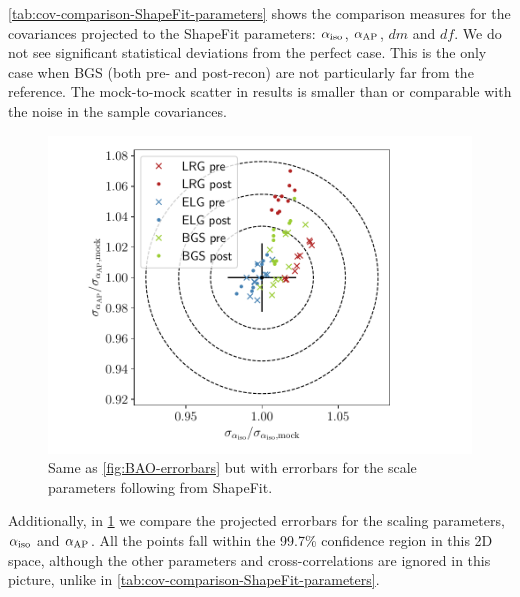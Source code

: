 \cref{tab:cov-comparison-ShapeFit-parameters} shows the comparison measures for the covariances projected to the ShapeFit parameters: ${\alpha_{\rm iso}}$, ${\alpha_{\rm AP}}$, $dm$ and $df$.
We do not see significant statistical deviations from the perfect case.
This is the only case when BGS (both pre- and post-recon) are not particularly far from the reference.
The mock-to-mock scatter in \rascalc{} results is smaller than or comparable with the noise in the sample covariances.

\begin{figure}[tb]
\centering
\includegraphics[width=\textwidth]{img/DESI-Y1/normalized_errorbars_shapefit.pdf}
\caption[Comparison of the projected errorbars for the BAO scale parameters for \desimock{} from ShapeFit]{Same as \cref{fig:BAO-errorbars} but with errorbars for the scale parameters following from ShapeFit.}
\label{fig:shapefit-scale-errorbars}
\end{figure}

Additionally, in \cref{fig:shapefit-scale-errorbars} we compare the projected errorbars for the scaling parameters, ${\alpha_{\rm iso}}$ and ${\alpha_{\rm AP}}$.
All the points fall within the 99.7\% confidence region in this 2D space, although the other parameters and cross-correlations are ignored in this picture, unlike in \cref{tab:cov-comparison-ShapeFit-parameters}.

